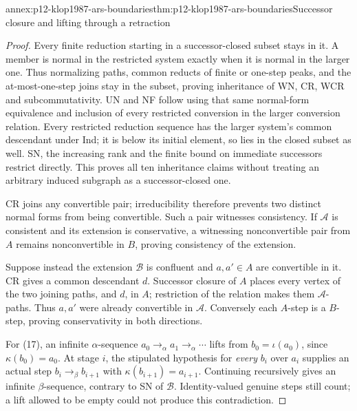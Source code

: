 \begin{annexitem}{annex:p12-klop1987-ars-boundaries}{thm:p12-klop1987-ars-boundaries}{Successor closure and lifting through a retraction}
\begin{proof}
Every finite reduction starting in a successor-closed subset stays in
it. A member is normal in the restricted system exactly when it is
normal in the larger one. Thus normalizing paths, common reducts of
finite or one-step peaks, and the at-most-one-step joins stay in the
subset, proving inheritance of WN, CR, WCR and subcommutativity.
UN and NF follow using that same normal-form equivalence and inclusion
of every restricted conversion in the larger conversion relation.
Every restricted reduction sequence has the larger system's common
descendant under Ind; it is below its initial element, so lies in the
closed subset as well. SN, the increasing rank and the finite bound
on immediate successors restrict directly. This proves all ten
inheritance claims without treating an arbitrary induced subgraph as
a successor-closed one.

CR joins any convertible pair; irreducibility therefore prevents two
distinct normal forms from being convertible. Such a pair witnesses
consistency. If \(\mathcal A\) is consistent and its extension
is conservative, a witnessing nonconvertible pair from \(A\)
remains nonconvertible in \(B\), proving consistency of the extension.

Suppose instead the extension \(\mathcal B\) is confluent and
\(a,a'\in A\) are convertible in it. CR gives a common descendant
\(d\). Successor closure of \(A\) places every vertex of the
two joining paths, and \(d\), in \(A\); restriction of the
relation makes them \(\mathcal A\)-paths. Thus \(a,a'\) were
already convertible in \(\mathcal A\). Conversely each \(A\)-step
is a \(B\)-step, proving conservativity in both directions.

For (17), an infinite \(\alpha\)-sequence
\(a_0\to_\alpha a_1\to_\alpha\cdots\) lifts from
\(b_0=\iota(a_0)\), since \(\kappa(b_0)=a_0\).
At stage \(i\), the stipulated hypothesis for \emph{every}
\(b_i\) over \(a_i\) supplies an actual step
\(b_i\to_\beta b_{i+1}\) with \(\kappa(b_{i+1})=a_{i+1}\).
Continuing recursively gives an infinite \(\beta\)-sequence,
contrary to SN of \(\mathcal B\). Identity-valued genuine steps
still count; a lift allowed to be empty could not produce this contradiction.
\end{proof}
\end{annexitem}

